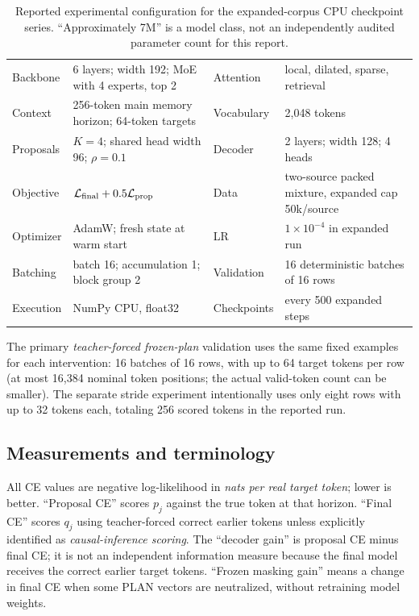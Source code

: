 \documentclass[11pt,letterpaper]{article}
\begin{document}
\begin{table}[ht]
\centering\small
\caption{Reported experimental configuration for the expanded-corpus CPU checkpoint series. ``Approximately 7M'' is a model class, not an independently audited parameter count for this report.}
\label{tab:config}
\begin{tabularx}{\linewidth}{@{}lXlX@{}}\toprule
Backbone & 6 layers; width 192; MoE with 4 experts, top 2 & Attention & local, dilated, sparse, retrieval\\
Context & 256-token main memory horizon; 64-token targets & Vocabulary & 2,048 tokens\\
Proposals & $K=4$; shared head width 96; $\rho=0.1$ & Decoder & 2 layers; width 128; 4 heads\\
Objective & $\mathcal L_{\rm final}+0.5\mathcal L_{\rm prop}$ & Data & two-source packed mixture, expanded cap 50k/source\\
Optimizer & AdamW; fresh state at warm start & LR & $1\times10^{-4}$ in expanded run\\
Batching & batch 16; accumulation 1; block group 2 & Validation & 16 deterministic batches of 16 rows\\
Execution & NumPy CPU, float32 & Checkpoints & every 500 expanded steps\\
\bottomrule\end{tabularx}
\end{table}

The primary \emph{teacher-forced frozen-plan} validation uses the same fixed examples for each intervention: 16 batches of 16 rows, with up to 64 target tokens per row (at most 16,384 nominal token positions; the actual valid-token count can be smaller). The separate stride experiment intentionally uses only eight rows with up to 32 tokens each, totaling 256 scored tokens in the reported run.

\subsection{Measurements and terminology}
All CE values are negative log-likelihood in \emph{nats per real target token}; lower is better. ``Proposal CE'' scores $p_j$ against the true token at that horizon. ``Final CE'' scores $q_j$ using teacher-forced correct earlier tokens unless explicitly identified as \emph{causal-inference scoring}. The ``decoder gain'' is proposal CE minus final CE; it is not an independent information measure because the final model receives the correct earlier target tokens. ``Frozen masking gain'' means a change in final CE when some PLAN vectors are neutralized, without retraining model weights.
\end{document}
